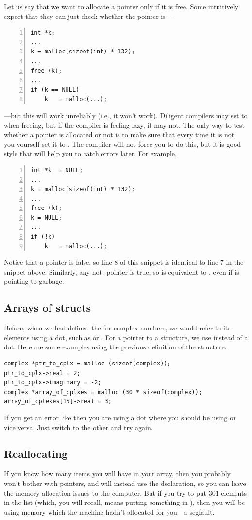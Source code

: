 Let us say that we want to allocate a pointer only if it is free. Some
intuitively expect that they can just check whether the pointer is
---
\begin{lstlisting}[numbers=left, numberstyle=\scshape]
int *k;
...
k = malloc(sizeof(int) * 132); 
...
free (k);
...
if (k == NULL)
    k   = malloc(...);
\end{lstlisting}
---but this will work unreliably (i.e., it won't work). Diligent compilers
may set  to  when freeing, but if the compiler is feeling
lazy, it may not. The only way
to test whether a pointer is allocated or not is to make sure that every
time it is not, you yourself set it to . The compiler will not
force you to do this, but it is good style that will help you to catch
errors later. For example,
\begin{lstlisting}[numbers=left, numberstyle=\scshape]
int *k  = NULL;
...
k = malloc(sizeof(int) * 132); 
...
free (k); 
k = NULL;
...
if (!k)
    k   = malloc(...);
\end{lstlisting}
Notice that a  pointer is false, so line 8 of this snippet is
identical to line 7 in the snippet above.
Similarly, any not- pointer is true,
so  is equivalent to , even if  is pointing
to garbage.


\subsection{Arrays of structs}	\ckeyind{$->$}
Before, when we had defined the  for complex numbers, we would refer to its elements using a
dot, such as  or . For a pointer to a structure, we use \ci{$->$} instead of 
a dot.  Here are some examples using the previous definition of the  structure.
\begin{lstlisting}
complex *ptr_to_cplx = malloc (sizeof(complex));
ptr_to_cplx->real = 2;
ptr_to_cplx->imaginary = -2;
complex *array_of_cplxes = malloc (30 * sizeof(complex));
array_of_cplexes[15]->real = 3;
\end{lstlisting}

If you get an error like  then you are
using a dot where you should be using \ci{$->$} or vice versa. Just switch to the other and try again.


\subsection{Reallocating} If you know how many items you will have
in your array, then you probably won't bother with pointers, and will
instead use the  declaration, so you can leave
the memory allocation issues to the computer. But if you try to put 301
elements in the list (which, you will recall, means putting something
in ), then you will be using memory which the
machine hadn't
allocated for you---a segfault.

